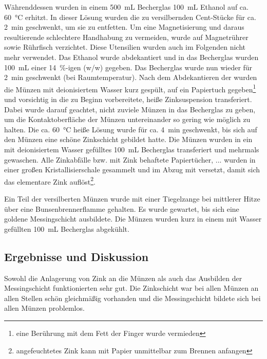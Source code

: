 \documentclass{article}
\begin{document}
        Währenddessen wurden in einem \SI[mode=text]{500}{\milli\liter} Becherglas \SI[mode=text]{100}{\milli\liter} Ethanol auf ca. \SI[mode=text]{60}{\degreeCelsius} erhitzt. In dieser Lösung wurden die zu versilbernden Cent-Stücke für ca. \SI[mode=text]{2}{\minute} geschwenkt, um sie zu entfetten. Um eine Magnetisierung und daraus resultierende schlechtere Handhabung zu vermeiden, wurde auf Magnetrührer sowie Rührfisch verzichtet. Diese Utensilien wurden auch im Folgenden nicht mehr verwendet. Das Ethanol wurde abdekantiert und in das Becherglas wurden \SI[mode=text]{100}{\milli\liter} einer \SI[mode=text]{14}{\percent}-igen (w/w)  gegeben. Das Becherglas wurde nun wieder für \SI[mode=text]{2}{\minute} geschwenkt (bei Raumtemperatur). Nach dem Abdekantieren der  wurden die Münzen mit deionisiertem Wasser kurz gespült, auf ein Papiertuch gegeben\footnote{eine Berührung mit dem Fett der Finger wurde vermieden} und vorsichtig in die zu Beginn vorbereitete, heiße Zinksuspension transferiert. Dabei wurde darauf geachtet, nicht zuviele Münzen in das Becherglas zu geben, um die Kontaktoberfläche der Münzen untereinander so gering wie möglich zu halten. Die ca. \SI[mode=text]{60}{\degreeCelsius} heiße Lösung wurde für ca. \SI[mode=text]{4}{\minute} geschwenkt, bis sich auf den Münzen eine schöne Zinkschicht gebildet hatte. Die Münzen wurden in ein mit deionisiertem Wasser gefülltes \SI[mode=text]{100}{\milli\liter} Becherglas transferiert und mehrmals gewaschen. Alle Zinkabfälle bzw. mit Zink behaftete Papiertücher, ... wurden in einer großen Kristallisierschale gesammelt und im Abzug mit  versetzt, damit sich das elementare Zink auflöst\footnote{angefeuchtetes Zink kann mit Papier unmittelbar zum Brennen anfangen}.
        
        Ein Teil der versilberten Münzen wurde mit einer Tiegelzange bei mittlerer Hitze über eine Bunsenbrennerflamme gehalten. Es wurde gewartet, bis sich eine goldene Messingschicht ausbildete. Die Münzen wurden kurz in einem mit Wasser gefüllten \SI[mode=text]{100}{\milli\liter} Becherglas abgekühlt.
      
    \subsection{Ergebnisse und Diskussion}
      
      Sowohl die Anlagerung von Zink an die Münzen als auch das Ausbilden der Messingschicht funktionierten sehr gut. Die Zinkschicht war bei allen Münzen an allen Stellen schön gleichmäßig vorhanden und die Messingschicht bildete sich bei allen Münzen problemlos. 
      
      
    
  \pagebreak
  
  \listofreactions
  \printbibliography[title=Literaturverzeichnis]
  \listoffigures
  \listoftables
  
\end{document}

